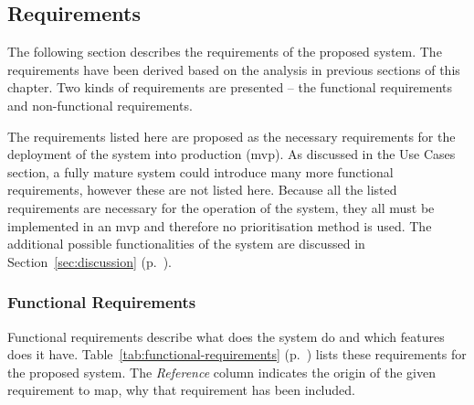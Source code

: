 \subsection{Requirements} \label{sec:analysis-requirements}
The following section describes the requirements of the proposed system. The requirements have been derived based on the analysis in previous sections of this chapter. Two kinds of requirements are presented -- the functional requirements and non-functional requirements. 

The requirements listed here are proposed as the necessary requirements for the deployment of the system into production (\acrlong{mvp}). As discussed in the Use Cases section, a fully mature system could introduce many more functional requirements, however these are not listed here. Because all the listed requirements are necessary for the operation of the system, they all must be implemented in an \acrshort{mvp} and therefore no prioritisation method is used. The additional possible functionalities of the system are discussed in Section~\ref{sec:discussion} (p.~\pageref{sec:discussion}).

\subsubsection{Functional Requirements} \label{sec:analysis-functionalReqruiements}
Functional requirements describe what does the system do and which features does it have. Table~\ref{tab:functional-requirements} (p.~\pageref{tab:functional-requirements}) lists these requirements for the proposed system. The \textit{Reference} column indicates the origin of the given requirement to map, why that requirement has been included.

